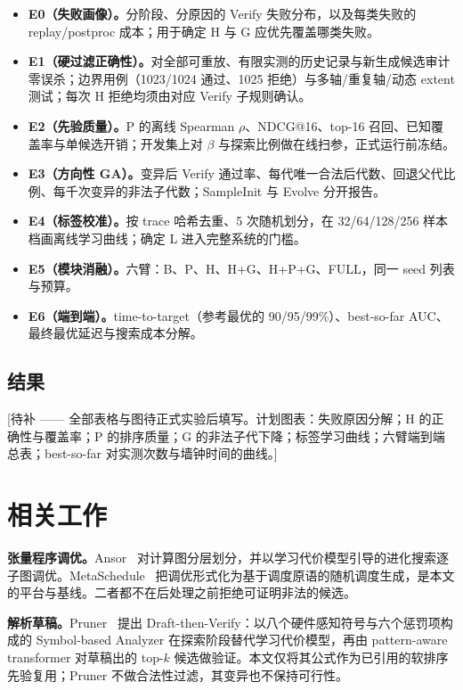 \documentclass[UTF8]{ctexart}
\begin{document}

\begin{itemize}
\item \textbf{E0（失败画像）。}分阶段、分原因的 Verify 失败分布，以及每类失败的 replay/postproc 成本；用于确定 H 与 G 应优先覆盖哪类失败。
\item \textbf{E1（硬过滤正确性）。}对全部可重放、有限实测的历史记录与新生成候选审计零误杀；边界用例（1023/1024 通过、1025 拒绝）与多轴/重复轴/动态 extent 测试；每次 H 拒绝均须由对应 Verify 子规则确认。
\item \textbf{E2（先验质量）。}P 的离线 Spearman $\rho$、NDCG@16、top-16 召回、已知覆盖率与单候选开销；开发集上对 $\beta$ 与探索比例做在线扫参，正式运行前冻结。
\item \textbf{E3（方向性 GA）。}变异后 Verify 通过率、每代唯一合法后代数、回退父代比例、每千次变异的非法子代数；SampleInit 与 Evolve 分开报告。
\item \textbf{E4（标签校准）。}按 trace 哈希去重、5 次随机划分，在 32/64/128/256 样本档画离线学习曲线；确定 L 进入完整系统的门槛。
\item \textbf{E5（模块消融）。}六臂：B、P、H、H+G、H+P+G、FULL，同一 seed 列表与预算。
\item \textbf{E6（端到端）。}time-to-target（参考最优的 90/95/99\%）、best-so-far AUC、最终最优延迟与搜索成本分解。
\end{itemize}

\subsection{结果}

[待补 —— 全部表格与图待正式实验后填写。计划图表：失败原因分解；H 的正确性与覆盖率；P 的排序质量；G 的非法子代下降；标签学习曲线；六臂端到端总表；best-so-far 对实测次数与墙钟时间的曲线。]

\section{相关工作}
\label{sec:related}

\textbf{张量程序调优。}Ansor~\cite{ansor} 对计算图分层划分，并以学习代价模型引导的进化搜索逐子图调优。MetaSchedule~\cite{metaschedule} 把调优形式化为基于调度原语的随机调度生成，是本文的平台与基线。二者都不在后处理之前拒绝可证明非法的候选。

\textbf{解析草稿。}Pruner~\cite{pruner} 提出 Draft-then-Verify：以八个硬件感知符号与六个惩罚项构成的 Symbol-based Analyzer 在探索阶段替代学习代价模型，再由 pattern-aware transformer 对草稿出的 top-$k$ 候选做验证。本文仅将其公式作为已引用的软排序先验复用；Pruner 不做合法性过滤，其变异也不保持可行性。
\end{document}
